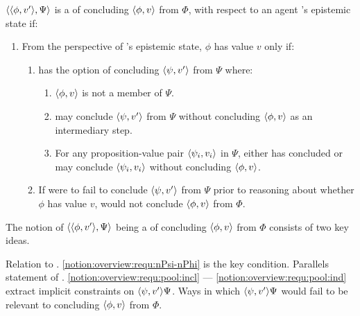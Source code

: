 \begin{note}
  \begin{notion}[\requ{3}]
    \label{notion:overview:requ}
    \(\langle \langle \phi, v' \rangle, \Psi \rangle\) is a \requ{} of concluding \(\langle \phi, v \rangle\) from \(\Phi\), with respect to an agent \vAgent{}'s epistemic state if:
    \begin{enumerate}
    \item
      \label{notion:overview:requ:main}
      From the perspective of \vAgent{}'s epistemic state, \(\phi\) has value \(v\) only if:
      \begin{enumerate}[label=\alph*., ref=\named{R:\alph*}]
      \item
        \label{notion:overview:requ:pool}
        \vAgent{} has the option of concluding \(\langle \psi, v' \rangle\) from \(\Psi\) where:
        \begin{enumerate}[label=\roman*., ref=\named{R:a.\roman*}, series=csIdeaCounter]
        \item
          \label{notion:overview:requ:pool:incl}
          \(\langle \phi, v \rangle\) is not a member of \(\Psi\).
        \item
          \label{notion:overview:requ:pool:int}
          \vAgent{} may conclude \(\langle \psi, v' \rangle\) from \(\Psi\) without concluding \(\langle \phi, v \rangle\) as an intermediary step.
        \item
          \label{notion:overview:requ:pool:ind}
          For any proposition-value pair \(\langle \psi_{i}, v_{i} \rangle\) in \(\Psi\), \vAgent{} either has concluded or may conclude \(\langle \psi_{i}, v_{i} \rangle\) without concluding \(\langle \phi, v \rangle\).
        \end{enumerate}
      \item
        \label{notion:overview:requ:nPsi-nPhi}
        If \vAgent{} were to fail to conclude \(\langle \psi, v' \rangle\) from \(\Psi\) prior to reasoning about whether \(\phi\) has value \(v\), \vAgent{} would not conclude \(\langle \phi, v \rangle\) from \(\Phi\).
      \end{enumerate}
    \end{enumerate}
    \vspace{-\baselineskip}
  \end{notion}
  The notion of \(\langle \langle \phi, v' \rangle, \Psi \rangle\) being a \requ{} of concluding \(\langle \phi, v \rangle\) from \(\Phi\) consists of two key ideas.
\end{note}

\begin{note}
  Relation to \qzs{}.
  \ref{notion:overview:requ:nPsi-nPhi} is the key condition.
  Parallels statement of \qzs{}.
  \ref{notion:overview:requ:pool:incl} --- \ref{notion:overview:requ:pool:ind} extract implicit constraints on \(\langle \psi, v' \rangle{\Psi}\).
  Ways in which \(\langle \psi, v' \rangle{\Psi}\) would fail to be relevant to concluding \(\langle \phi, v \rangle\) from \(\Phi\).
\end{note}

